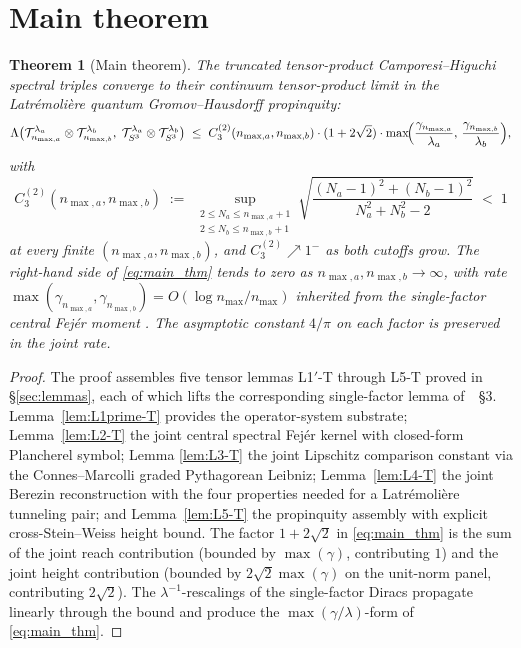 \documentclass[11pt,a4paper]{article}
\theoremstyle{plain}
\newtheorem{theorem}{Theorem}[section]
\theoremstyle{definition}
\newcommand{\nmax}{n_{\max}}
\newcommand{\nmaxa}{n_{\max,a}}
\newcommand{\nmaxb}{n_{\max,b}}
\newcommand{\sthree}{S^{3}}
\newcommand{\Tcal}{\mathcal{T}}
\begin{document}
\section{Main theorem}\label{sec:main_theorem}

\begin{theorem}[Main theorem]\label{thm:main}
The truncated tensor-product Camporesi--Higuchi spectral triples
converge to their continuum tensor-product limit in the
Latr\'emoli\`ere quantum Gromov--Hausdorff propinquity:
\begin{equation}\label{eq:main_thm}
   \Lambda\bigl(\Tcal_{\nmaxa}^{\lambda_a} \otimes
                \Tcal_{\nmaxb}^{\lambda_b},\;
                \Tcal_{\sthree}^{\lambda_a} \otimes
                \Tcal_{\sthree}^{\lambda_b}\bigr)
   \;\le\; C_3^{(2)}(\nmaxa, \nmaxb) \cdot (1 + 2\sqrt{2}) \cdot
            \max\!\Bigl(\frac{\gamma_{\nmaxa}}{\lambda_a},\,
                        \frac{\gamma_{\nmaxb}}{\lambda_b}\Bigr),
\end{equation}
with
\begin{equation}\label{eq:C3_2_full}
   C_3^{(2)}(\nmaxa, \nmaxb)
   \;:=\; \sup_{\substack{2 \le N_a \le \nmaxa+1 \\ 2 \le N_b \le \nmaxb+1}}
            \sqrt{\frac{(N_a - 1)^2 + (N_b - 1)^2}{N_a^2 + N_b^2 - 2}}
   \;<\; 1
\end{equation}
at every finite $(\nmaxa, \nmaxb)$, and $C_3^{(2)} \nearrow 1^-$ as
both cutoffs grow. The right-hand side of \eqref{eq:main_thm} tends to
zero as $\nmaxa, \nmaxb \to \infty$, with rate
$\max(\gamma_{\nmaxa}, \gamma_{\nmaxb}) = O(\log \nmax / \nmax)$
inherited from the single-factor central Fej\'er moment
\cite{loutey_paper38}. The asymptotic constant $4/\pi$ on each factor
is preserved in the joint rate.
\end{theorem}

\begin{proof}
The proof assembles five tensor lemmas L1$'$-T through L5-T proved in
\S\ref{sec:lemmas}, each of which lifts the corresponding single-factor
lemma of~\cite{loutey_paper38}~\S 3. Lemma~\ref{lem:L1prime-T} provides
the operator-system substrate; Lemma~\ref{lem:L2-T} the joint central
spectral Fej\'er kernel with closed-form Plancherel symbol; Lemma
\ref{lem:L3-T} the joint Lipschitz comparison constant via the
Connes--Marcolli graded Pythagorean Leibniz; Lemma~\ref{lem:L4-T} the
joint Berezin reconstruction with the four properties needed for a
Latr\'emoli\`ere tunneling pair; and Lemma~\ref{lem:L5-T} the
propinquity assembly with explicit cross-Stein--Weiss height bound.
The factor $1 + 2\sqrt{2}$ in \eqref{eq:main_thm} is the sum of the
joint reach contribution (bounded by $\max(\gamma)$, contributing $1$)
and the joint height contribution (bounded by $2\sqrt{2}\max(\gamma)$
on the unit-norm panel, contributing $2\sqrt{2}$). The
$\lambda^{-1}$-rescalings of the single-factor Diracs propagate
linearly through the bound and produce the
$\max(\gamma/\lambda)$-form of \eqref{eq:main_thm}.
\end{proof}
\end{document}
